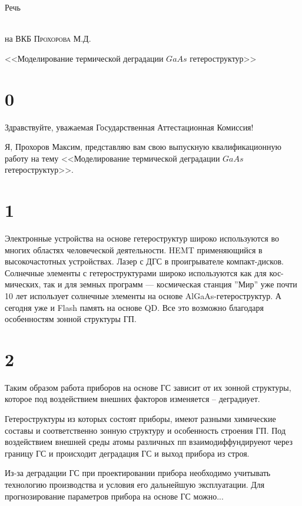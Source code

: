 \documentclass[utf8, 14pt]{G7-32}
\begin{document}
\frontmatter
\begin{center}
	\begin{LARGE}
		Речь
	\end{LARGE}\\
	 на ВКБ \textsc{Прохорова М.Д.}\\
	 \begin{large}
	 <<Моделирование термической деградации $GaAs$ гетероструктур>>
	 \end{large}
\end{center}

\section{0}
Здравствуйте, уважаемая Государственная Аттестационная Комиссия!

Я, Прохоров Максим, представляю вам свою выпускную квалификационную работу на тему <<Моделирование термической деградации $GaAs$ гетероструктур>>.

\section{1}
Электронные устройства на основе гетероструктур широко используются во многих областях человеческой деятельности. HEMT применяющийся в высокочастотных устройствах. Лазер с ДГС в проигрывателе компакт-дисков. Солнечные элементы с гетероструктурами широко используются как для кос- мических, так и для земных программ — космическая станция ”Мир” уже почти 10 лет использует солнечные элементы на основе AlGaAs-гетероструктур. А сегодня уже и Flash память на основе QD.
Все это возможно благодаря особенностям зонной структуры ГП. 

\section{2}
Таким образом работа приборов на основе ГС зависит от их зонной структуры, которое под воздействием внешних факторов изменяется -- деградиует.

Гетероструктуры из которых состоят приборы, имеют разными химические составы и соответственно зонную структуру и особенность строения ГП. Под воздействием внешней среды атомы различных пп взаимодиффундируеют через границу ГС и происходит деградация ГС и выход прибора из строя.

Из-за деградации ГС при проектировании прибора необходимо учитывать технологию производства и условия его дальнейшую эксплуатации. Для прогнозирование параметров прибора на основе ГС можно... 
\end{document}
